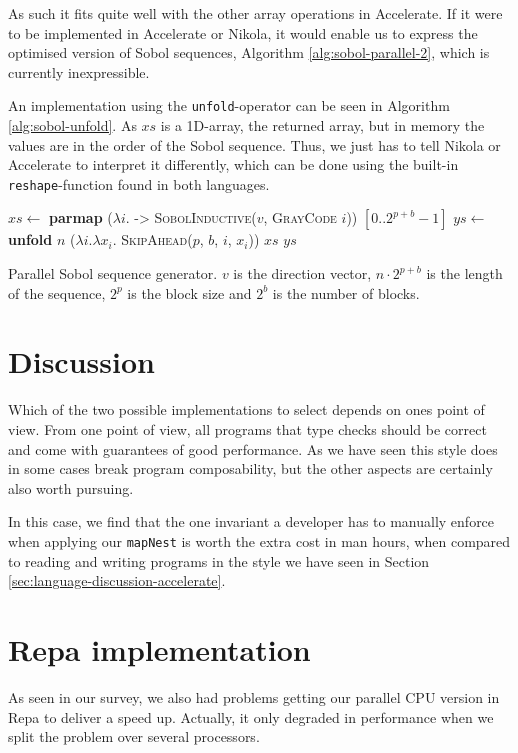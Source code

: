 As such it fits quite well with the other array operations in
Accelerate. If it were to be implemented in Accelerate or Nikola, it
would enable us to express the optimised version of Sobol sequences,
Algorithm \ref{alg:sobol-parallel-2}, which is currently
inexpressible. 

An implementation using the \lstinline{unfold}-operator can be seen in
Algorithm \ref{alg:sobol-unfold}. As $xs$ is a 1D-array, the returned
array, but in memory the values are in the order of the Sobol
sequence. Thus, we just has to tell Nikola or Accelerate to interpret
it differently, which can be done using the built-in
\lstinline{reshape}-function found in both languages.

\begin{algorithm}
  \begin{algorithmic}
    \State $xs \gets$ \textbf{parmap} ($\lambda i$. -> \textsc{SobolInductive}($v$, \textsc{GrayCode} $i$)) $[0..2^{p+b}-1]$
    \State $ys \gets$ \textbf{unfold} $n$ ($\lambda i. \lambda x_i$. \textsc{SkipAhead}($p$, $b$, $i$, $x_i$)) $xs$
    \State \Return $ys$
    \EndFunction
  \end{algorithmic}
  \caption{Parallel Sobol sequence generator. $v$ is the direction
    vector, $n \cdot 2^{p+b}$ is the length of the sequence, $2^p$ is the block size
    and $2^b$ is the number of blocks.}
  \label{alg:sobol-unfold}
\end{algorithm}


\section{Discussion}
Which of the two possible implementations to select depends on ones
point of view. From one point of view, all programs that type checks
should be correct and come with guarantees of good performance. As we
have seen this style does in some cases break program composability,
but the other aspects are certainly also worth pursuing.

In this case, we find that the one invariant a developer has to
manually enforce when applying our \lstinline{mapNest} is worth the
extra cost in man hours, when compared to reading and writing programs
in the style we have seen in Section
\ref{sec:language-discussion-accelerate}.


\section{Repa implementation}
As seen in our survey, we also had problems getting our parallel CPU
version in Repa to deliver a speed up. Actually, it only degraded in
performance when we split the problem over several processors.

